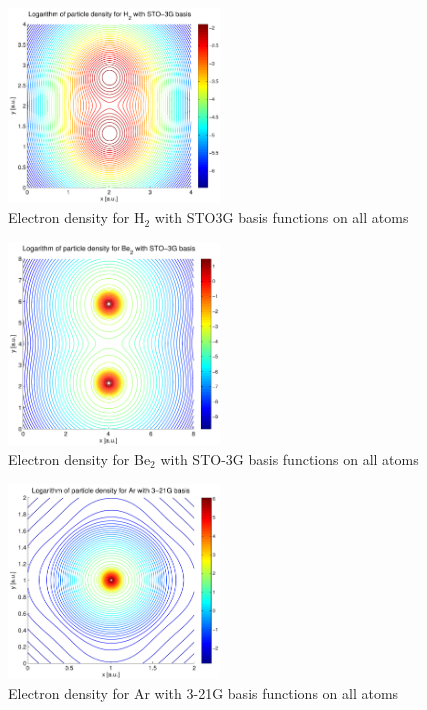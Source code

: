 \documentclass[a4paper,10pt, twocolumn, pre]{revtex4}
\begin{document}
\begin{figure}[h!tb]
\includegraphics[width=0.5\textwidth]{./figures/H2density_sto3g.pdf}
\caption{Electron density for H$_2$ with STO3G basis functions on all atoms}
\end{figure}

\begin{figure}[h!tb]
\includegraphics[width=0.5\textwidth]{./figures/Be2density_sto3g.pdf}
\caption{Electron density for Be$_2$ with STO-3G basis functions on all atoms}
\end{figure}

\begin{figure}[h!tb]
\includegraphics[width=0.5\textwidth]{./figures/Ardensity_321g.pdf}
\caption{Electron density for Ar with 3-21G basis functions on all atoms}
\end{figure}
\end{document}

